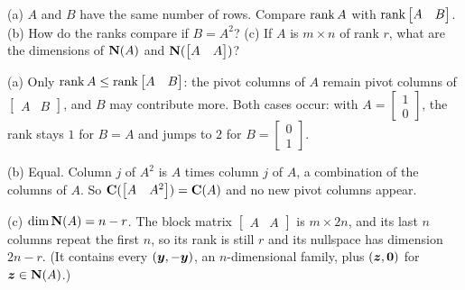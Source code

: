 \begin{exercise}[Question 3]\label{exr:u40-q3}
(a) $A$ and $B$ have the same number of rows. Compare $\operatorname{rank} A$ with $\operatorname{rank}\begin{bmatrix}A&B\end{bmatrix}$.
(b) How do the ranks compare if $B=A^{2}$?
(c) If $A$ is $m\times n$ of rank $r$, what are the dimensions of $\mathbf{N}(A)$ and $\mathbf{N}(\begin{bmatrix}A&A\end{bmatrix})$?
\end{exercise}
\begin{solution}
(a) Only $\operatorname{rank} A\le\operatorname{rank}\begin{bmatrix}A&B\end{bmatrix}$: the pivot columns of $A$ remain pivot columns of $\begin{bmatrix}A&B\end{bmatrix}$, and $B$ may contribute more. Both cases occur: with $A=\begin{bmatrix}1\\0\end{bmatrix}$, the rank stays $1$ for $B=A$ and jumps to $2$ for $B=\begin{bmatrix}0\\1\end{bmatrix}$.

(b) Equal. Column $j$ of $A^{2}$ is $A$ times column $j$ of $A$, a combination of the columns of $A$. So $\mathbf{C}(\begin{bmatrix}A&A^{2}\end{bmatrix})=\mathbf{C}(A)$ and no new pivot columns appear.

(c) $\dim\mathbf{N}(A)=n-r$. The block matrix $\begin{bmatrix}A&A\end{bmatrix}$ is $m\times2n$, and its last $n$ columns repeat the first $n$, so its rank is still $r$ and its nullspace has dimension $2n-r$. (It contains every $(\boldsymbol{y},-\boldsymbol{y})$, an $n$-dimensional family, plus $(\boldsymbol{z},\boldsymbol{0})$ for $\boldsymbol{z}\in\mathbf{N}(A)$.)
\end{solution}

